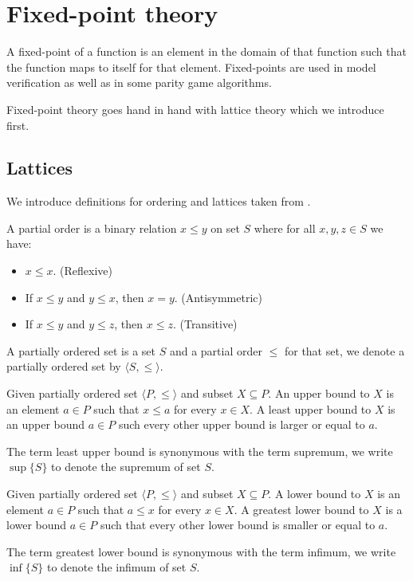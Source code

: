\section{Fixed-point theory} 
A fixed-point of a function is an element in the domain of that function such that the function maps to itself for that element. Fixed-points are used in model verification as well as in some parity game algorithms.

Fixed-point theory goes hand in hand with lattice theory which we introduce first.
\subsection{Lattices}
We introduce definitions for ordering and lattices taken from \cite{birkhoff1940lattice}.
\begin{definition}
	A partial order is a binary relation $x \leq y$ on set $S$ where for all $x,y,z \in S$ we have:
	\begin{itemize}
		\item $x \leq x$. (Reflexive)
		\item If $x \leq y$ and $y \leq x$, then $x=y$. (Antisymmetric)
		\item If $x \leq y$ and $y \leq z$, then $x \leq z$. (Transitive)
	\end{itemize}
\end{definition}

\begin{definition}
	A partially ordered set is a set $S$ and a partial order $\leq$ for that set, we denote a partially ordered set by $\langle S, \leq \rangle$.
\end{definition}

\begin{definition}
	Given partially ordered set $\langle P,\leq \rangle$ and subset $X \subseteq P$. An upper bound to $X$ is an element $a \in P$ such that $x \leq a$ for every $x\in X$. A least upper bound to $X$ is an upper bound $a \in P$ such every other upper bound is larger or equal to $a$.
\end{definition}
The term least upper bound is synonymous with the term supremum, we write $\sup \{ S \}$ to denote the supremum of set $S$.
\begin{definition}
	Given partially ordered set $\langle P,\leq \rangle$ and subset $X \subseteq P$. A lower bound to $X$ is an element $a \in P$ such that $a \leq x$ for every $x\in X$. A greatest lower bound to $X$ is a lower bound $a \in P$ such that every other lower bound is smaller or equal to $a$.
\end{definition}
The term greatest lower bound is synonymous with the term infimum, we write $\inf \{ S\}$ to denote the infimum of set $S$.

